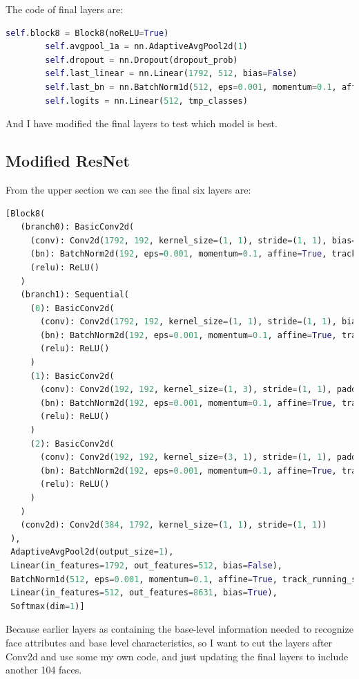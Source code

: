 \documentclass{article}
\begin{document}
The code of final layers are:
\begin{lstlisting}[language=Python, caption=Final layer Codes]
        self.block8 = Block8(noReLU=True)
        self.avgpool_1a = nn.AdaptiveAvgPool2d(1)
        self.dropout = nn.Dropout(dropout_prob)
        self.last_linear = nn.Linear(1792, 512, bias=False)
        self.last_bn = nn.BatchNorm1d(512, eps=0.001, momentum=0.1, affine=True)
        self.logits = nn.Linear(512, tmp_classes)
\end{lstlisting}
And I have modified the final layers to test which model is best.

\subsection{Modified ResNet}
From the upper section we can see the final six layers are:
\begin{lstlisting}[language=Python, caption=Final layers]
[Block8(
   (branch0): BasicConv2d(
     (conv): Conv2d(1792, 192, kernel_size=(1, 1), stride=(1, 1), bias=False)
     (bn): BatchNorm2d(192, eps=0.001, momentum=0.1, affine=True, track_running_stats=True)
     (relu): ReLU()
   )
   (branch1): Sequential(
     (0): BasicConv2d(
       (conv): Conv2d(1792, 192, kernel_size=(1, 1), stride=(1, 1), bias=False)
       (bn): BatchNorm2d(192, eps=0.001, momentum=0.1, affine=True, track_running_stats=True)
       (relu): ReLU()
     )
     (1): BasicConv2d(
       (conv): Conv2d(192, 192, kernel_size=(1, 3), stride=(1, 1), padding=(0, 1), bias=False)
       (bn): BatchNorm2d(192, eps=0.001, momentum=0.1, affine=True, track_running_stats=True)
       (relu): ReLU()
     )
     (2): BasicConv2d(
       (conv): Conv2d(192, 192, kernel_size=(3, 1), stride=(1, 1), padding=(1, 0), bias=False)
       (bn): BatchNorm2d(192, eps=0.001, momentum=0.1, affine=True, track_running_stats=True)
       (relu): ReLU()
     )
   )
   (conv2d): Conv2d(384, 1792, kernel_size=(1, 1), stride=(1, 1))
 ),
 AdaptiveAvgPool2d(output_size=1),
 Linear(in_features=1792, out_features=512, bias=False),
 BatchNorm1d(512, eps=0.001, momentum=0.1, affine=True, track_running_stats=True),
 Linear(in_features=512, out_features=8631, bias=True),
 Softmax(dim=1)]
\end{lstlisting}
Because earlier layers as containing the base-level information needed to recognize face attributes and base level characteristics, so I want to cut the layers after Conv2d and use some my own code, and just updating the final layers to include another 104 faces.
\end{document}
